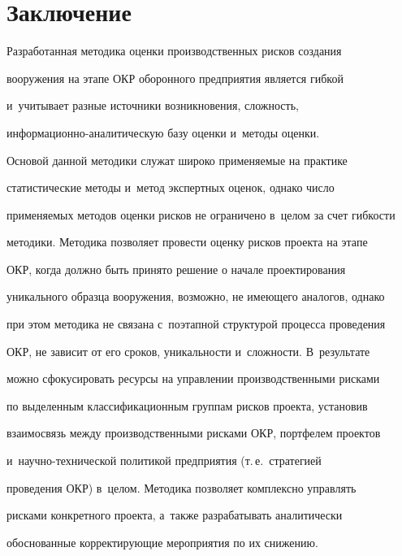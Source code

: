 \section{Заключение}










      Разработанная методика оценки производственных рисков создания 


вооружения на этапе ОКР оборонного предприятия является гибкой 


и~учитывает разные источники возникновения, слож\-ность,  


ин\-фор\-ма\-ци\-он\-но-ана\-ли\-ти\-че\-скую базу оценки и~методы оценки. 


Основой данной методики служат широко применяемые на практике 


статистические методы и~метод экспертных оценок, однако число 


применяемых методов оценки рисков не ограничено в~целом за счет гибкости 


методики. Методика позволяет провести оценку рисков проекта на этапе 


ОКР, когда должно быть принято решение о начале проектирования 


уникального образца вооружения, возможно, не имеющего аналогов, однако 


при этом методика не связана с~поэтапной структурой процесса проведения 


ОКР, не зависит от его сроков, уникальности и~сложности. В~результате 


можно сфокусировать ресурсы на управлении производственными рисками 


по выделенным классификационным группам рисков проекта, установив 


взаимосвязь между производственными рисками ОКР, портфелем проектов 


и~на\-уч\-но-тех\-ни\-че\-ской политикой предприятия (т.\,е.\ стратегией 


проведения ОКР) в~целом. Методика позволяет комплексно управлять 


рисками конкретного проекта, а~также разрабатывать аналитически 


обоснованные корректирующие мероприятия по их снижению.


